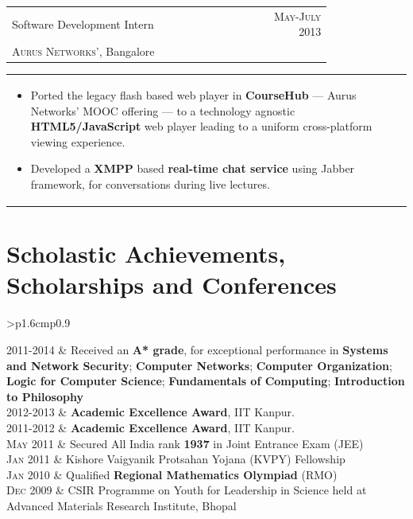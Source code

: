 \documentclass[a4paper]{article} %
\newcommand{\cproject}[5]{
    \begin{tabular}{p{0.80\linewidth}r}
        \textcolor{NavyBlue}{\small #2} & \multicolumn{1}{m{4cm}}{\raggedleft \small {\textsc{#1}}}\\
        \small {#3} & \small {#4}
    \end{tabular}
    \begin{tabular}{p{\linewidth}}
    \vspace{-0.3cm}
        \footnotesize {#5}
    \end{tabular}
    \vspace{-0.5cm}
}
\newcommand{\itemlist}[1]{
    \begin{tabular}{>{\raggedleft}p{1.6cm}p{0.9\linewidth}}
        #1
    \end{tabular}
}
\begin{document}
\cproject
    {May-July 2013}
    {Software Development Intern}
    {\textsc{Aurus Networks'}, Bangalore}
    {}
    {
        \begin{itemize}[leftmargin=0.5cm]
            \item Ported the legacy flash based web player in \textbf{CourseHub} --- Aurus Networks'
                MOOC offering --- to a technology agnostic \textbf{HTML5/JavaScript} web player leading
                to a uniform cross-platform viewing experience.
            \item Developed a \textbf{XMPP} based \textbf{real-time chat service} using Jabber framework,
                for conversations during live lectures.
        \end{itemize}
    }

\section{Scholastic Achievements, Scholarships and Conferences}

\itemlist {
    \textsc{\small 2011-2014}   & Received an \textbf{A* grade}, for exceptional performance in
                                    \textbf{Systems and Network Security};
                                    \textbf{Computer Networks};
                                    \textbf{Computer Organization};
                                    \textbf{Logic for Computer Science};
                                    \textbf{Fundamentals of Computing};
                                    \textbf{Introduction to Philosophy} \\
    \textsc{\small 2012-2013}   & \textbf{Academic Excellence Award}, IIT Kanpur. \\
    \textsc{\small 2011-2012}   & \textbf{Academic Excellence Award}, IIT Kanpur. \\
    \textsc{\small May 2011}    & Secured All India rank \textbf{1937} in Joint Entrance Exam (JEE) \\
    \textsc{\small Jan 2011}    & Kishore Vaigyanik Protsahan Yojana (KVPY) Fellowship \\
    \textsc{\small Jan 2010}    & Qualified \textbf{Regional Mathematics Olympiad} (RMO) \\
    \textsc{\small Dec 2009}    & CSIR Programme on Youth for Leadership in Science held at Advanced Materials Research Institute, Bhopal\\
}
\end{document}
